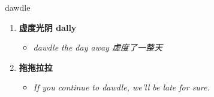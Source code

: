 
\begin{frame}
{\huge dawdle}
\begin{center}
\begin{enumerate}\Large
  \item \textbf{虚度光阴 dally}
  \begin{itemize}
    \item \em{\Large{dawdle the day away 虚度了一整天}}
  \end{itemize}
  \item \textbf{拖拖拉拉}
  \begin{itemize}
    \item \em{\Large{If you continue to dawdle, we'll be late for sure.}}
  \end{itemize}
\end{enumerate}
\end{center}
\end{frame}
